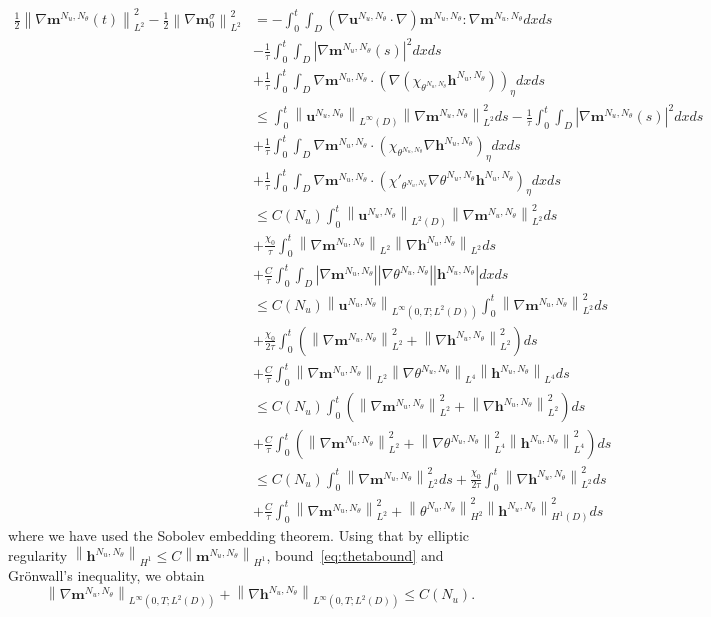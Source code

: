 \documentclass[10pt,letterpaper,twoside]{amsart}
\theoremstyle{definition}{\newtheorem{definition}[lemma]{Definition}}
\theoremstyle{note}{\newtheorem{claim}{Claim}[section]
\newtheorem*{claim*}{Claim}}
\numberwithin{equation}{section}
\newcommand{\dom}{D}
\newcommand{\norm}[1]{\left\| #1 \right\|}
\newcommand{\Grad}{\nabla}
\newcommand{\bm}{\mathbf{m}}
\newcommand{\bmb}{\mathbf{m}^{N_u,N_\theta}}
\newcommand{\bhb}{\mathbf{h}^{N_u,N_\theta}}
\newcommand{\bub}{\mathbf{u}^{N_u,N_\theta}}
\newcommand{\thb}{\theta^{N_u,N_\theta}}
\begin{document}
\begin{align*}
	\frac12\norm{\Grad\bmb(t)}_{L^2}^2 - \frac12\norm{\Grad\bm^\sigma_0}_{L^2}^2&  = -\int_0^t \int_{\dom}(\Grad\bub\cdot\Grad)\bmb : \Grad \bmb dxds\\
	& -\frac{1}{\tau}\int_0^t \int_{\dom} |\Grad\bmb(s)|^2 dxds \\
	&+\frac{1}{\tau}\int_0^t \int_{\dom} \Grad\bmb \cdot (\Grad(\chi_{\thb}\bhb ))_\eta dx ds\\
	&\leq \int_0^t\norm{\bub}_{L^\infty(\dom)}\norm{\Grad\bmb}_{L^2}^2 ds-\frac{1}{\tau}\int_0^t \int_{\dom} |\Grad\bmb(s)|^2 dxds \\
	& +\frac{1}{\tau}\int_0^t \int_{\dom} \Grad\bmb \cdot (\chi_{\thb}\Grad \bhb )_\eta dx ds \\
	&+\frac{1}{\tau}\int_0^t \int_{\dom}  \Grad\bmb\cdot (\chi'_{\thb}\Grad\thb\bhb)_\eta dx ds\\
	& \leq C(N_u) \int_0^t\norm{\bub}_{L^2(\dom)}\norm{\Grad\bmb}_{L^2}^2 ds \\
	&+ \frac{\chi_0}{\tau}\int_0^t \norm{\Grad\bmb}_{L^2}\norm{\Grad\bhb}_{L^2}ds \\
	& +\frac{C}{\tau}\int_0^t \int_{\dom}  |\Grad\bmb| |\Grad\thb| |\bhb| dx ds\\
	&\leq C(N_u)\norm{\bub}_{L^\infty(0,T;L^2(\dom))} \int_0^t\norm{\Grad\bmb}_{L^2}^2 ds \\
	&+ \frac{\chi_0}{2\tau}\int_0^t \left(\norm{\Grad\bmb}_{L^2}^2+\norm{\Grad\bhb}_{L^2}^2\right) ds \\
	& +\frac{C}{\tau}\int_0^t \norm{\Grad\bmb}_{L^2}\norm{\Grad\thb}_{L^4}\norm{\bhb}_{L^4} ds\\
&\leq C(N_u)\int_0^t\left(\norm{\Grad\bmb}_{L^2}^2  +\norm{\Grad\bhb}_{L^2}^2\right)ds \\
& +\frac{C}{\tau}\int_0^t \left(\norm{\Grad\bmb}_{L^2}^2 + \norm{\Grad\thb}_{L^4}^2\norm{\bhb}_{L^4}^2 \right)ds\\
	&\leq C(N_u)\int_0^t\norm{\Grad\bmb}_{L^2}^2 ds + \frac{\chi_0}{2\tau}\int_0^t\norm{\Grad\bhb}_{L^2}^2ds \\
	& +\frac{C}{\tau}\int_0^t \norm{\Grad\bmb}_{L^2}^2 + \norm{\thb}_{H^2}^2\norm{\bhb}_{H^1(\dom)}^2 ds
\end{align*}
where we have used the Sobolev embedding theorem.
Using that by elliptic regularity $\norm{ \bhb}_{H^1}\leq C \norm{\bmb}_{H^1}$, bound~\eqref{eq:thetabound} and Gr\"onwall's inequality, we obtain
\begin{equation}\label{eq:mestimateindepofkappa}
	\norm{\Grad\bmb}_{L^\infty(0,T;L^2(\dom))}+\norm{\Grad\bhb}_{L^\infty(0,T;L^2(\dom))}\leq C(N_u).
\end{equation}
\end{document}
